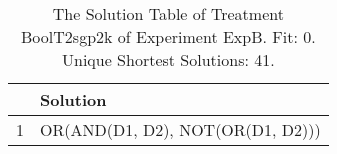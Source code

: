 \begin{table}[ht]
\centering
\begin{tabular}{rp{9cm}}
  \hline
 & Solution \\ 
  \hline
1 & OR(AND(D1, D2), NOT(OR(D1, D2))) \\ 
   \hline
\end{tabular}
\caption{The Solution Table of Treatment BoolT2sgp2k of Experiment ExpB. Fit: 0. Unique Shortest Solutions: 41.} 
\end{table}
